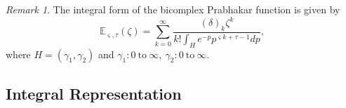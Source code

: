 \documentclass[a4paper,12pt]{article}
\theoremstyle{remark}
\newtheorem{remark}[theorem]{Remark}
\begin{document}
\begin{remark} The integral form of the bicomplex Prabhakar function is given by 
\begin{equation}
\mathbb{E}_{ \varsigma,\tau}(\zeta)= \sum_{k=0}^{\infty}\frac{(\delta)_k\zeta^k}{k!\displaystyle\int_{H}e^{-p}p^{ \varsigma k +\tau-1}dp},  
\end{equation}
where $H=(\gamma_1,\gamma_2)$ and $\gamma_1:0 ~\text{to}~ \infty,~\gamma_2:0 ~\text{to}~ \infty.$	
\end{remark}


\subsection{Integral Representation }
\end{document}
